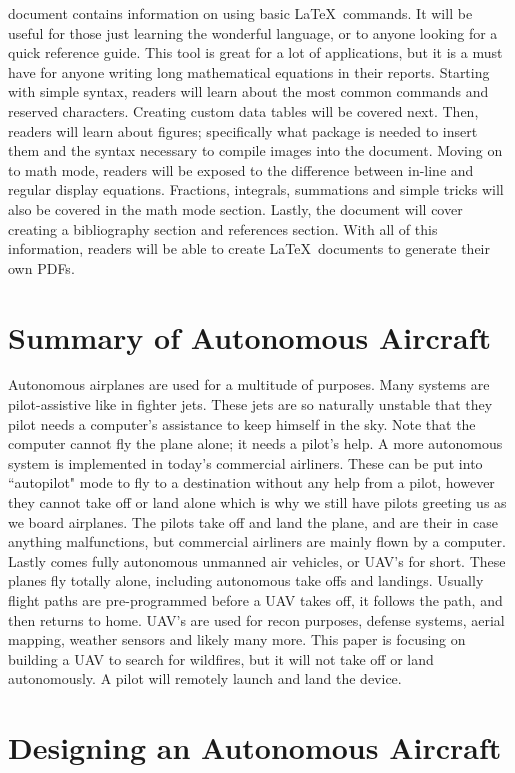 \documentclass[12pt,journal,compsoc]{IEEEtran}
\begin{document}
 document contains information on using basic \LaTeX\ commands. It will be useful for those just learning the wonderful language, or to anyone looking for a quick reference guide. This tool is great for a lot of applications, but it is a must have for anyone writing long mathematical equations in their reports. Starting with simple syntax, readers will learn about the most common commands and reserved characters. Creating custom data tables will be covered next. Then, readers will learn about figures; specifically what package is needed to insert them and the syntax necessary to compile images into the document. Moving on to math mode, readers will be exposed to the difference between in-line and regular display equations. Fractions, integrals, summations and simple tricks will also be covered in the math mode section. Lastly, the document will cover creating a bibliography section and references section. With all of this information, readers will be able to create \LaTeX\ documents to generate their own PDFs.

\section{Summary of Autonomous Aircraft}
Autonomous airplanes are used for a multitude of purposes. Many systems are pilot-assistive like in fighter jets. These jets are so naturally unstable that they pilot needs a computer's assistance to keep himself in the sky. Note that the computer cannot fly the plane alone; it needs a pilot's help. A more autonomous system is implemented in today's commercial airliners. These can be put into ``autopilot" mode to fly to a destination without any help from a pilot, however they cannot take off or land alone which is why we still have pilots greeting us as we board airplanes. The pilots take off and land the plane, and are their in case anything malfunctions, but commercial airliners are mainly flown by a computer. Lastly comes fully autonomous unmanned air vehicles, or UAV's for short. These planes fly totally alone, including autonomous take offs and landings. Usually flight paths are pre-programmed before a UAV takes off, it follows the path, and then returns to home. UAV's are used for recon purposes, defense systems, aerial mapping, weather sensors and likely many more. This paper is focusing on building a UAV to search for wildfires, but it will not take off or land autonomously. A pilot will remotely launch and land the device.

\section{Designing an Autonomous Aircraft}
\end{document}
